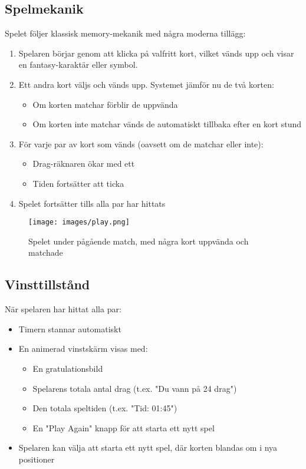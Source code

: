 \documentclass[a4paper,12pt]{article}
\begin{document}
\subsection*{Spelmekanik}
Spelet följer klassisk memory-mekanik med några moderna tillägg:
\begin{enumerate}
    \item Spelaren börjar genom att klicka på valfritt kort, vilket vänds upp och visar en fantasy-karaktär eller symbol.
    \item Ett andra kort väljs och vänds upp. Systemet jämför nu de två korten:
    \begin{itemize}
        \item Om korten matchar förblir de uppvända
        \item Om korten inte matchar vänds de automatiskt tillbaka efter en kort stund
    \end{itemize}
    \item För varje par av kort som vänds (oavsett om de matchar eller inte):
    \begin{itemize}
        \item Drag-räknaren ökar med ett
        \item Tiden fortsätter att ticka
    \end{itemize}
    \item Spelet fortsätter tills alla par har hittats
\end{enumerate}

\begin{figure}[h]
    \centering
    \texttt{[image: images/play.png]}
    \caption{Spelet under pågående match, med några kort uppvända och matchade}
    \label{fig:game_play}
\end{figure}

\subsection*{Vinsttillstånd}
När spelaren har hittat alla par:
\begin{itemize}
    \item Timern stannar automatiskt
    \item En animerad vinstskärm visas med:
    \begin{itemize}
        \item En gratulationsbild
        \item Spelarens totala antal drag (t.ex. "Du vann på 24 drag")
        \item Den totala speltiden (t.ex. "Tid: 01:45")
        \item En "Play Again" knapp för att starta ett nytt spel
    \end{itemize}
    \item Spelaren kan välja att starta ett nytt spel, där korten blandas om i nya positioner
\end{itemize}
\end{document}
